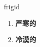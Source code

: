
\begin{frame}
{\huge frigid}
\begin{center}
\begin{enumerate}\Large
  \item \textbf{严寒的}
  \item \textbf{冷漠的}
\end{enumerate}
\end{center}
\end{frame}
